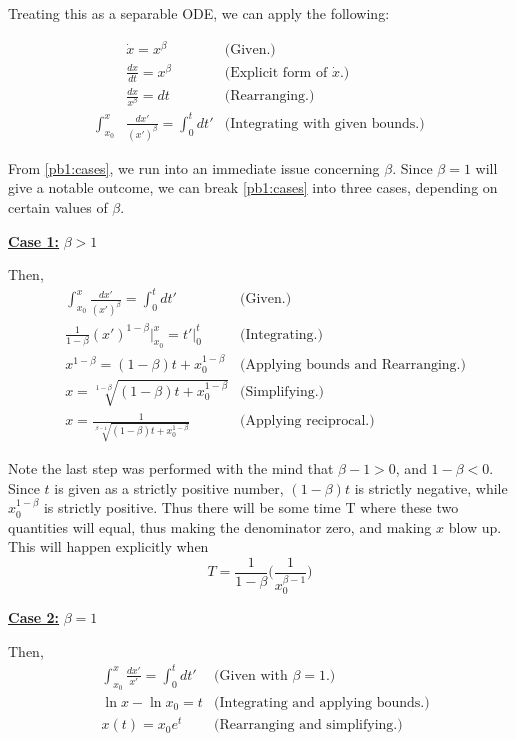 \partbreak
\begin{solution}

Treating this as a separable ODE, we can apply the following:

\alignbreak
\begin{align}
&\dot{x} = x^\beta &\text{(Given.)} \nonumber\\
&\frac{dx}{dt} = x^\beta &\text{(Explicit form of $\dot{x}$.)} \nonumber\\
&\frac{dx}{x^\beta} = dt &\text{(Rearranging.)} \nonumber\\        
\int_{x_0}^x &\frac{dx'}{(x')^\beta} = \int_0^t dt' &\text{(Integrating with given bounds.)} \label{pb1:cases}
\end{align}
\alignbreak

From \ref{pb1:cases}, we run into an immediate issue concerning $\beta$. Since $\beta = 1$ will give a notable outcome, we can break \ref{pb1:cases} into three cases, depending on certain values of $\beta$.

\alignbreak

\newpage
\underline{\textbf{Case 1:}} $\beta > 1$

Then, 
\begin{align}
 &\int_{x_0}^x \frac{dx'}{(x')^\beta} = \int_0^t dt' &\text{(Given.)}\nonumber\\
 &\frac{1}{1 - \beta}(x')^{1 - \beta}\bigg|_{x_0}^x = t' \bigg|_0^t &\text{(Integrating.)}\nonumber\\
&x^{1 - \beta} = (1 - \beta)t + x_0^{1 - \beta} &\text{(Applying bounds and Rearranging.)} \nonumber\\
&x = \sqrt[1 - \beta]{(1 - \beta)t + x_0^{1 - \beta}} &\text{(Simplifying.)}\nonumber\\
&x = \frac{1}{\sqrt[\beta - 1]{(1 - \beta)t + x_0^{1 - \beta}}} &\text{(Applying reciprocal.)} \nonumber
\end{align}

Note the last step was performed with the mind that $\beta - 1 > 0$, and $1 - \beta < 0$. Since $t$ is given as a strictly positive number, $(1 - \beta)t$ is strictly negative, while $x_0^{1 - \beta}$ is strictly positive. Thus there will be some time T where these two quantities will equal, thus making the denominator zero, and making $x$ blow up. This will happen explicitly when
\[T = \frac{1}{1 - \beta}\Bigg(\frac{1}{x_0^{\beta - 1}}\Bigg)\]

\underline{\textbf{Case 2:}} $\beta = 1$

Then,
\begin{align}
     &\int_{x_0}^x \frac{dx'}{x'} = \int_0^t dt' &\text{(Given with $\beta = 1$.)}\nonumber\\
    &\ln{x} - \ln x_0 = t &\text{(Integrating and applying bounds.)}\nonumber\\
    &x(t) = x_0e^t &\text{(Rearranging and simplifying.)}\nonumber\\
\end{align}


\end{solution}
